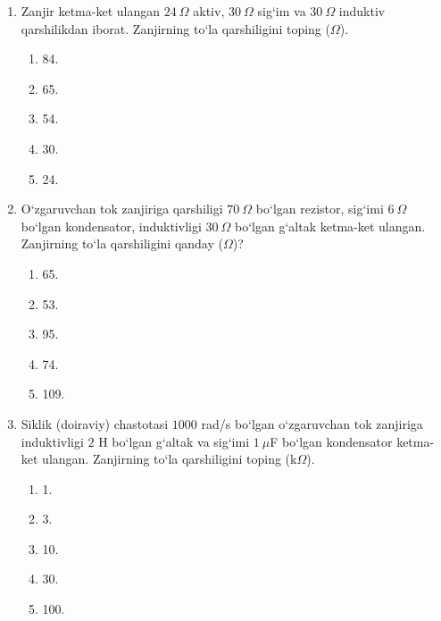 \begin{enumerate}

\begin{enumerate}[label=\Alph*)]
\item 70.
\item 10.
\item 50.
\item 60.
\item 5.
\end{enumerate}

\item Zanjir ketma-ket ulangan $24~\Omega$ aktiv, $30~\Omega$ sig‘im va $30~\Omega$ induktiv qarshilikdan iborat. Zanjirning to‘la qarshiligini toping ($\Omega$).
\begin{enumerate}[label=\Alph*)]
\item 84.
\item 65.
\item 54.
\item 30.
\item 24.
\end{enumerate}

\item O‘zgaruvchan tok zanjiriga qarshiligi $70~\Omega$ bo‘lgan rezistor, sig‘imi $6~\Omega$ bo‘lgan kondensator, induktivligi $30~\Omega$ bo‘lgan g‘altak ketma-ket ulangan. Zanjirning to‘la qarshiligini qanday ($\Omega$)?
\begin{enumerate}[label=\Alph*)]
\item 65.
\item 53.
\item 95.
\item 74.
\item 109.
\end{enumerate}

\item Siklik (doiraviy) chastotasi $1000$ rad/s bo‘lgan o‘zgaruvchan tok zanjiriga induktivligi $2$ H bo‘lgan g‘altak va sig‘imi $1~\mu$F bo‘lgan kondensator ketma-ket ulangan. Zanjirning to‘la qarshiligini toping (k$\Omega$).
\begin{enumerate}[label=\Alph*)]
\item 1.
\item 3.
\item 10.
\item 30.
\item 100.
\end{enumerate}


\end{enumerate}

